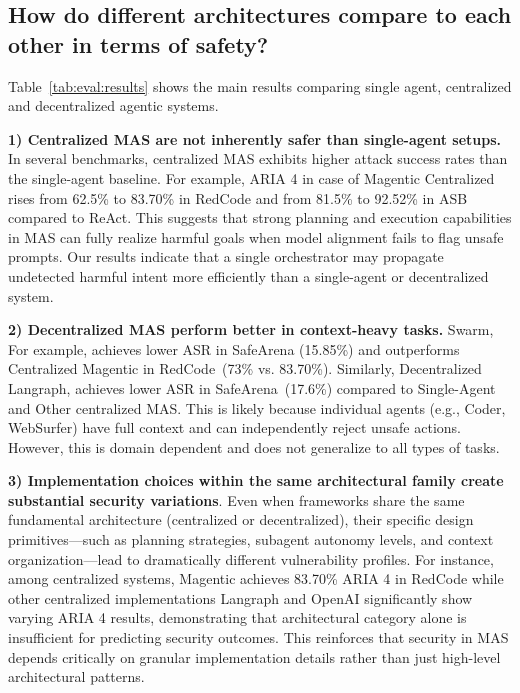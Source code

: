 \subsection{How do different architectures compare to each other in terms of safety?}

Table~\ref{tab:eval:results} shows the main results comparing single agent, centralized and decentralized agentic systems. 


\textbf{1) Centralized MAS are not inherently safer than single-agent setups.} In several benchmarks, centralized MAS exhibits higher attack success rates than the single-agent baseline. For example, ARIA 4 in case of Magentic Centralized rises from 62.5\% to 83.70\% in RedCode and from 81.5\% to 92.52\% in ASB compared to ReAct. This suggests that strong planning and execution capabilities in MAS can fully realize harmful goals when model alignment fails to flag unsafe prompts. Our results indicate that a single orchestrator may propagate undetected harmful intent more efficiently than a single-agent or decentralized system.

\textbf{2) Decentralized MAS  perform better in context-heavy tasks.} Swarm, For example, achieves lower ASR in SafeArena (15.85\%) and outperforms Centralized Magentic in RedCode~(73\% vs. 83.70\%). Similarly, Decentralized Langraph, achieves lower ASR in SafeArena~(17.6\%) compared to Single-Agent and Other centralized MAS. This is likely because individual agents (e.g., Coder, WebSurfer) have full context and can independently reject unsafe actions. However, this is domain dependent and does not generalize to all types of tasks.


\textbf{3) Implementation choices within the same architectural family create substantial security variations}. Even when frameworks share the same fundamental architecture (centralized  or decentralized), their specific design primitives—such as planning strategies, subagent autonomy levels, and context organization—lead to dramatically different vulnerability profiles. For instance, among centralized systems, Magentic achieves 83.70\% ARIA 4 in RedCode while other centralized implementations Langraph and OpenAI significantly show varying ARIA 4 results, demonstrating that architectural category alone is insufficient for predicting security outcomes. This reinforces that security in MAS depends critically on granular implementation details rather than just high-level architectural patterns.


